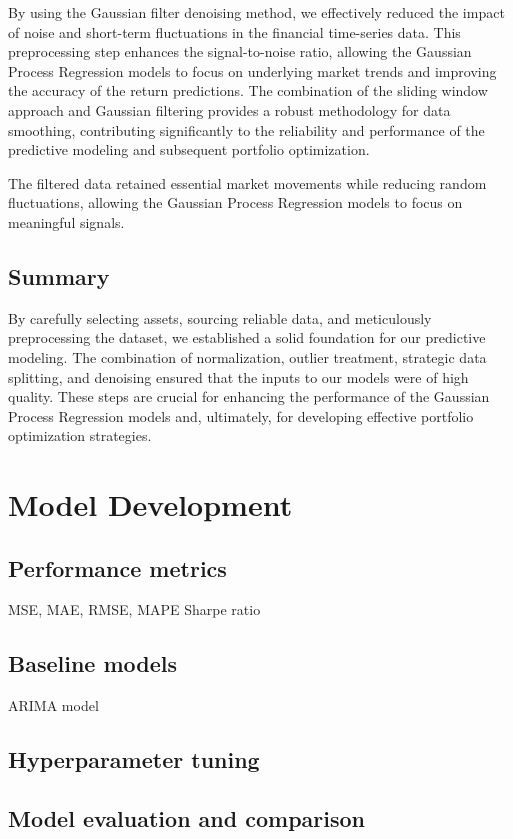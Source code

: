 By using the Gaussian filter denoising method, we effectively reduced the impact of noise and short-term fluctuations in the financial time-series data. This preprocessing step enhances the signal-to-noise ratio, allowing the Gaussian Process Regression models to focus on underlying market trends and improving the accuracy of the return predictions. The combination of the sliding window approach and Gaussian filtering provides a robust methodology for data smoothing, contributing significantly to the reliability and performance of the predictive modeling and subsequent portfolio optimization.

The filtered data retained essential market movements while reducing random fluctuations, allowing the Gaussian Process Regression models to focus on meaningful signals.


\subsection{Summary}

By carefully selecting assets, sourcing reliable data, and meticulously preprocessing the dataset, we established a solid foundation for our predictive modeling. The combination of normalization, outlier treatment, strategic data splitting, and denoising ensured that the inputs to our models were of high quality. These steps are crucial for enhancing the performance of the Gaussian Process Regression models and, ultimately, for developing effective portfolio optimization strategies.



\section{Model Development}
\subsection{Performance metrics}
MSE, MAE, RMSE, MAPE
Sharpe ratio
\subsection{Baseline models}
ARIMA model
\subsection{Hyperparameter tuning}
\subsection{Model evaluation and comparison}
